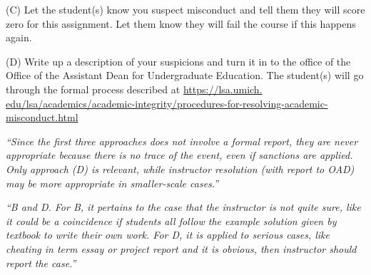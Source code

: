 \documentclass[12pt]{beamer}
\newcommand\ans[1]{{\it ``#1''}}
\newcommand\gap{\vspace{5mm}}
\begin{document}
\begin{frame}

(C) Let the student(s) know you suspect misconduct and tell them they will score zero for this assignment. Let them know they will fail the course if this happens again.

(D) Write up a description of your suspicions and turn it in to the office of the Office of the Assistant Dean for Undergraduate Education. The student(s) will go through the formal process described at
\url{https://lsa.umich. edu/lsa/academics/academic-integrity/procedures-for-resolving-academic-misconduct.html}

\end{frame}

\begin{frame}


  \ans{Since  the  first  three  approaches  does  not  involve  a  formal  report,  they  are  never appropriate because there is no trace of the event, even if sanctions are applied.  Only approach  (D)  is  relevant,  while  instructor  resolution  (with  report  to  OAD)  may  be more appropriate in smaller-scale cases.}

  \gap
  
  \ans{B and D. For B, it pertains to the case that the instructor is not quite sure, like it could be a coincidence if students all follow the example solution given by textbook to write their own work. For D, it is applied to serious cases, like cheating in term essay or project report and it is obvious, then instructor should report the case.}
  






\end{frame}
\end{document}

